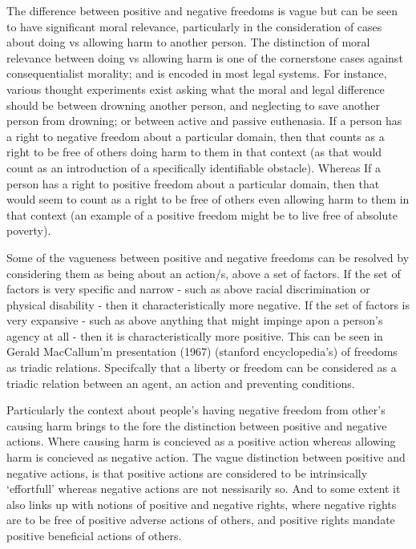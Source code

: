 The difference between positive and negative freedoms is vague but can be seen to have significant moral relevance, particularly in the consideration of cases about doing vs allowing harm to another person.
The distinction of moral relevance between doing vs allowing harm is one of the cornerstone cases against consequentialist morality; and is encoded in most legal systems.
For instance, various thought experiments exist asking what the moral and legal difference should be between drowning another person, and neglecting to save another person from drowning; or between active and passive euthenasia.
If a person has a right to negative freedom about a particular domain, then that counts as a right to be free of others doing harm to them in that context (as that would count as an introduction of a specifically identifiable obstacle).
Whereas If a person has a right to positive freedom about a particular domain, then that would seem to count as a right to be free of others even allowing harm to them in that context (an example of a positive freedom might be to live free of absolute poverty).

Some of the vagueness between positive and negative freedoms can be resolved by considering them as being about an action/s, above a set of factors.
If the set of factors is very specific and narrow - such as above racial discrimination or physical disability - then it characteristically more negative.
If the set of factors is very expansive - such as above anything that might impinge apon a person's agency at all - then it is characteristically more positive.
This can be seen in Gerald MacCallum'm presentation (1967) (stanford encyclopedia's) of freedoms as triadic relations. Specifcally that a liberty or freedom can be considered as a triadic relation between an agent, an action and preventing conditions.

Particularly the context about people's having negative freedom from other's causing harm brings to the fore the distinction between positive and negative actions.
Where causing harm is concieved as a positive action whereas allowing harm is concieved as negative action.
The vague distinction between positive and negative actions, is that positive actions are considered to be intrinsically `effortfull' whereas negative actions are not nessisarily so.\cite{Mossel2009} And to some extent it also links up with notions of positive and negative rights, where negative rights are to be free of positive adverse actions of others, and positive rights mandate positive beneficial actions of others.

